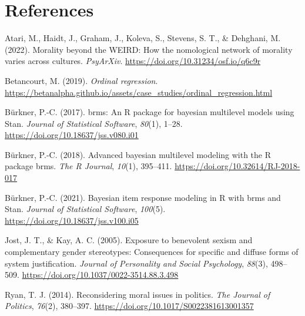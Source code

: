 \documentclass[12pt, letterpaper]{article}
\newenvironment{CSLReferences}[2]{}{}
\begin{document}
\newpage

\hypertarget{references}{%
\section{References}\label{references}}

\begingroup

\noindent \setlength{\parindent}{-0.5in} \setlength{\leftskip}{0.5in}

\hypertarget{refs}{}
\begin{CSLReferences}{1}{0}
\leavevmode{}%
Atari, M., Haidt, J., Graham, J., Koleva, S., Stevens, S. T., \&
Dehghani, M. (2022). Morality beyond the {WEIRD}: How the nomological
network of morality varies across cultures. \emph{PsyArXiv}.
\url{https://doi.org/10.31234/osf.io/q6c9r}

\leavevmode{}%
Betancourt, M. (2019). \emph{Ordinal regression}.
\url{https://betanalpha.github.io/assets/case_studies/ordinal_regression.html}

\leavevmode{}%
Bürkner, P.-C. (2017). {brms}: An {R} package for bayesian multilevel
models using {Stan}. \emph{Journal of Statistical Software},
\emph{80}(1), 1--28. \url{https://doi.org/10.18637/jss.v080.i01}

\leavevmode{}%
Bürkner, P.-C. (2018). Advanced bayesian multilevel modeling with the
{R} package brms. \emph{The R Journal}, \emph{10}(1), 395--411.
\url{https://doi.org/10.32614/RJ-2018-017}

\leavevmode{}%
Bürkner, P.-C. (2021). Bayesian item response modeling in {R} with brms
and {Stan}. \emph{Journal of Statistical Software}, \emph{100}(5).
\url{https://doi.org/10.18637/jss.v100.i05}

\leavevmode{}%
Jost, J. T., \& Kay, A. C. (2005). Exposure to benevolent sexism and
complementary gender stereotypes: Consequences for specific and diffuse
forms of system justification. \emph{Journal of Personality and Social
Psychology}, \emph{88}(3), 498--509.
\url{https://doi.org/10.1037/0022-3514.88.3.498}

\leavevmode{}%
Ryan, T. J. (2014). Reconsidering moral issues in politics. \emph{The
Journal of Politics}, \emph{76}(2), 380--397.
\url{https://doi.org/10.1017/S0022381613001357}


\end{CSLReferences}
\end{document}
